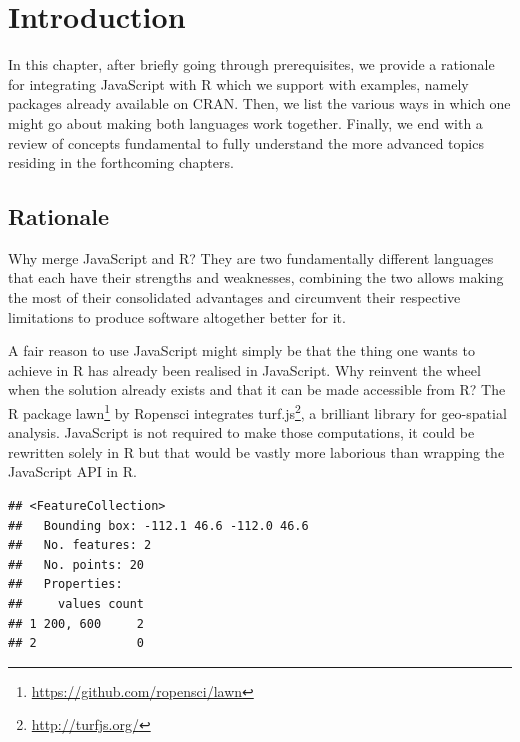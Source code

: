 \documentclass[
]{krantz}
\makeatletter
\newenvironment{Shaded}{\begin{snugshade}}{\end{snugshade}}
\newcommand{\KeywordTok}[1]{\textcolor[rgb]{0.27,0.27,0.27}{\textbf{#1}}}
\newcommand{\NormalTok}[1]{#1}
\newcommand{\OperatorTok}[1]{\textcolor[rgb]{0.43,0.43,0.43}{\textbf{#1}}}
\newcommand{\StringTok}[1]{\textcolor[rgb]{0.5,0.5,0.5}{#1}}
\renewcommand{\href}[2]{#2\footnote{\url{#1}}}
\newenvironment{kframe}{%
\medskip{}
\setlength{\fboxsep}{.8em}
 \def\at@end@of@kframe{}%
 \ifinner\ifhmode%
  \def\at@end@of@kframe{\end{minipage}}%
  \begin{minipage}{\columnwidth}%
 \fi\fi%
 \def\FrameCommand##1{\hskip\@totalleftmargin \hskip-\fboxsep
 \colorbox{shadecolor}{##1}\hskip-\fboxsep
     \hskip-\linewidth \hskip-\@totalleftmargin \hskip\columnwidth}%
 \MakeFramed {\advance\hsize-\width
   \@totalleftmargin\z@ \linewidth\hsize
   \@setminipage}}%
 {\par\unskip\endMakeFramed%
 \at@end@of@kframe}
\renewenvironment{Shaded}{\begin{kframe}}{\end{kframe}}
\makeatother
\begin{document}
\hypertarget{introduction}{%
\chapter{Introduction}\label{introduction}}

In this chapter, after briefly going through prerequisites, we provide a rationale for integrating JavaScript with R which we support with examples, namely packages already available on CRAN. Then, we list the various ways in which one might go about making both languages work together. Finally, we end with a review of concepts fundamental to fully understand the more advanced topics residing in the forthcoming chapters.

\hypertarget{rationale}{%
\section*{Rationale}\label{rationale}}


Why merge JavaScript and R? They are two fundamentally different languages that each have their strengths and weaknesses, combining the two allows making the most of their consolidated advantages and circumvent their respective limitations to produce software altogether better for it.

A fair reason to use JavaScript might simply be that the thing one wants to achieve in R has already been realised in JavaScript. Why reinvent the wheel when the solution already exists and that it can be made accessible from R? The R package \href{https://github.com/ropensci/lawn}{lawn} \citep{R-lawn} by Ropensci integrates \href{http://turfjs.org/}{turf.js}, a brilliant library for geo-spatial analysis. JavaScript is not required to make those computations, it could be rewritten solely in R but that would be vastly more laborious than wrapping the JavaScript API in R.

\begin{Shaded}
\end{Shaded}

\begin{verbatim}
## <FeatureCollection>
##   Bounding box: -112.1 46.6 -112.0 46.6
##   No. features: 2
##   No. points: 20
##   Properties: 
##     values count
## 1 200, 600     2
## 2              0
\end{verbatim}
\end{document}
